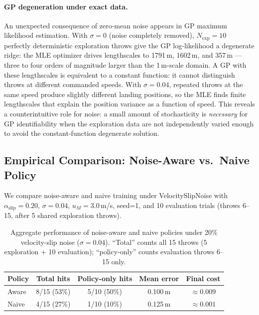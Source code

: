 \paragraph{GP degeneration under exact data.}
An unexpected consequence of zero-mean noise appears in GP maximum likelihood
estimation.
With $\sigma = 0$ (noise completely removed), $N_{\mathrm{exp}} = 10$ perfectly
deterministic exploration throws give the GP log-likelihood a degenerate ridge: the
MLE optimizer drives lengthscales to 1791\,m, 1602\,m, and 357\,m — three to four
orders of magnitude larger than the 1\,m-scale domain.
A GP with these lengthscales is equivalent to a constant function: it cannot
distinguish throws at different commanded speeds.
With $\sigma = 0.04$, repeated throws at the same speed produce slightly different
landing positions, so the MLE finds finite lengthscales that explain the
position variance as a function of speed.
This reveals a counterintuitive role for noise: a small amount of stochasticity is
\emph{necessary} for GP identifiability when the exploration data are not
independently varied enough to avoid the constant-function degenerate solution.

\subsection{Empirical Comparison: Noise-Aware vs.\ Naive Policy}
\label{sec:study2:empirical}

We compare noise-aware and naive training under VelocitySlipNoise with
$\alpha_{\mathrm{slip}} = 0.20$, $\sigma = 0.04$, $u_M = 3.0$\,m/s, seed=1, and 10
evaluation trials (throws 6–15, after 5 shared exploration throws).

\begin{table}[t]
  \centering
  \caption{Aggregate performance of noise-aware and naive policies under 20\%
           velocity-slip noise ($\sigma = 0.04$).
           ``Total'' counts all 15 throws (5 exploration + 10 evaluation);
           ``policy-only'' counts evaluation throws 6–15 only.}
  \label{tab:noise_aggregate}
  \small
  \begin{tabular}{lcccc}
    \toprule
    Policy & Total hits & Policy-only hits & Mean error & Final cost \\
    \midrule
    Aware & 8/15 (53\%) & 5/10 (50\%) & 0.100\,m & $\approx 0.009$ \\
    Naive & 4/15 (27\%) & 1/10 (10\%) & 0.125\,m & $\approx 0.001$ \\
    \bottomrule
  \end{tabular}
\end{table}

